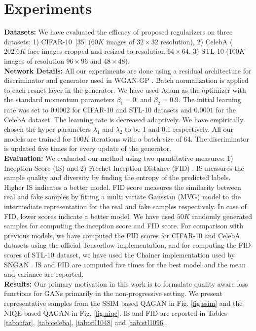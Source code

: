 \documentclass{article}
\begin{document}
\section{Experiments}
\textbf{Datasets:} We have evaluated the efficacy of proposed regularizers on three datasets:
1) CIFAR-10\ [35] ($60K$ images of $32 \times 32$ resolution), 2) CelebA \cite{liu2015deep}($202.6K$ face images cropped and resized to resolution $64 \times 64$. 3) STL-10  \cite{coates2011analysis}
 ($100K$ images of resolution $96 \times 96 $ and $48 \times 48$).
\\
\textbf{Network Details:}
All our experiments are done using a residual architecture for discriminator and generator used in WGAN-GP \cite{gulrajani2017improved}. Batch normalization is applied to each resnet layer in the generator. We have used Adam as the optimizer with the standard momentum parameters $\beta_{1} =0.$ and $\beta_{2} =0.9$. The initial learning rate was set to $0.0002$ for CIFAR-10 and STL-10 datasets and $0.0001$ for the CelebA dataset. The learning rate is decreased adaptively. We have empirically chosen the hyper parameters $\lambda_{1}$ and $\lambda_{2}$ to be 1 and 0.1 respectively. All our models are trained for $100K$ iterations with a batch size of 64. The discriminator is updated five times for every update of the generator.
\\
\textbf{Evaluation:} We evaluated our method using two quantitative measures: 1) Inception Score (IS) \cite{salimans2016improved} and 2) Frechet Inception Distance (FID) \cite{heusel2017gans}. IS measures the sample quality and diversity by finding the entropy of the predicted labels. Higher IS indicates a better model. FID score  measures the similarity between real and fake samples by fitting a multi variate Gaussian (MVG) model to the intermediate representation for the real and fake samples respectively. In case of FID, lower scores indicate a better model. We have used $50K$ randomly generated samples for computing the inception score and FID score. For comparison with previous models, we have computed the FID scores for CIFAR-10 and CelebA datasets using the official Tensorflow implementation, and for computing the FID scores of STL-10 dataset, we have used the Chainer implementation used by SNGAN \cite{miyato2018spectral}. IS and FID are computed five times for the best model and the mean and variance are reported.
\\
\textbf{Results:} 
Our primary motivation in this work is to formulate quality aware loss functions for GANs primarily in the non-progressive setting. We present representative samples from the SSIM based QAGAN in Fig. \ref{fig:ssim} and the NIQE based QAGAN in Fig. \ref{fig:niqe}. IS and FID are reported in Tables \ref{tab:cifar},  \ref{tab:celeba}, \ref{tab:stl1048} and \ref{tab:stl1096}.
\end{document}
